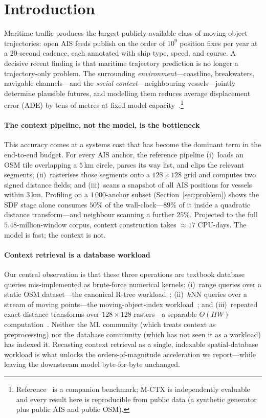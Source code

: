 \section{Introduction}\label{sec:intro}

Maritime traffic produces the largest publicly available class of
moving-object trajectories: open AIS feeds publish on the order of
$10^{9}$ position fixes per year at a $20$-second cadence, each annotated
with ship type, speed, and course. A decisive recent finding is that
maritime trajectory prediction is no longer a trajectory-only problem.
The surrounding \emph{environment}---coastline, breakwaters, navigable
channels---and the \emph{social context}---neighbouring vessels---jointly
determine plausible futures, and modelling them reduces average
displacement error (ADE) by tens of metres at fixed model
capacity~\cite{envshipbench2026}.\footnote{Reference~\cite{envshipbench2026}
is a companion benchmark; M-CTX is independently evaluable and every
result here is reproducible from public data (a synthetic generator plus
public AIS and public OSM).}

\paragraph*{The context pipeline, not the model, is the bottleneck}
This accuracy comes at a systems cost that has become the dominant term
in the end-to-end budget. For every AIS anchor, the reference pipeline
(i)~loads an OSM tile overlapping a $5$\,km circle, parses its way list,
and clips the relevant segments; (ii)~rasterises those segments onto a
$128\!\times\!128$ grid and computes two signed distance fields; and
(iii)~scans a snapshot of all AIS positions for vessels within $3$\,km.
Profiling on a $1\,000$-anchor subset (Section~\ref{sec:problem}) shows
the SDF stage alone consumes $50\%$ of the wall-clock---$89\%$ of it
inside a quadratic distance transform---and neighbour scanning a further
$25\%$. Projected to the full $5.48$-million-window corpus, context
construction takes $\approx\!17$ CPU-days. The model is fast; the context
is not.

\paragraph*{Context retrieval is a database workload}
Our central observation is that these three operations are textbook
database queries mis-implemented as brute-force numerical kernels:
(i)~range queries over a static OSM dataset---the canonical R-tree
workload~\cite{guttman1984rtree}; (ii)~$k$NN queries over a stream of
moving points---the moving-object-index
workload~\cite{saltenis2000tpr,jensen2004bx}; and (iii)~repeated exact
distance transforms over $128\!\times\!128$ rasters---a separable
$\Theta(HW)$ computation~\cite{felzenszwalb2004distance}. Neither the ML
community (which treats context as preprocessing) nor the database
community (which has not seen it as a workload) has indexed it. Recasting
context retrieval as a single, indexable spatial-database workload is
what unlocks the orders-of-magnitude acceleration we report---while
leaving the downstream model byte-for-byte unchanged.

